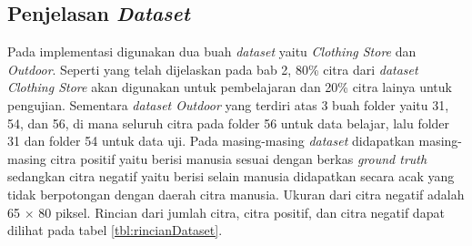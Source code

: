 \subsection{Penjelasan \textit{Dataset}}
\noindent Pada implementasi digunakan dua buah \textit{dataset} yaitu \textit{Clothing Store} dan \textit{Outdoor}. Seperti yang telah dijelaskan pada bab 2, 80\% citra dari \textit{dataset Clothing Store} akan digunakan untuk pembelajaran dan 20\% citra lainya untuk pengujian. Sementara \textit{dataset Outdoor} yang terdiri atas 3 buah folder yaitu 31, 54, dan 56, di mana seluruh citra pada folder 56 untuk data belajar, lalu folder 31 dan folder 54 untuk data uji. Pada masing-masing \textit{dataset} didapatkan masing-masing citra positif yaitu berisi manusia sesuai dengan berkas \textit{ground truth} sedangkan citra negatif yaitu berisi selain manusia didapatkan secara acak yang tidak berpotongan dengan daerah citra manusia. Ukuran dari citra negatif adalah 65 $\times$ 80 piksel. Rincian dari jumlah citra, citra positif, dan citra negatif dapat dilihat pada tabel \ref{tbl:rincianDataset}.
\begingroup
\setlength{\LTleft}{-20cm plus -1fill}
\setlength{\LTright}{\LTleft}
